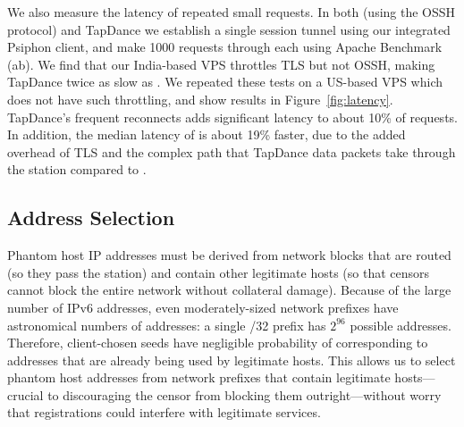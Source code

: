 \documentclass[sigconf,anonymous]{acmart}
\begin{document}
We also measure the latency of repeated small requests. In both \scheme (using
the OSSH protocol) and
TapDance we establish a single session tunnel using our integrated Psiphon
client, and make 1000 requests through each using Apache Benchmark (ab). We find
that our India-based VPS throttles TLS but not OSSH, making TapDance twice as slow as
\scheme. We repeated these tests on a US-based VPS which does not have such
throttling, and show results in Figure~\ref{fig:latency}. TapDance's frequent
reconnects adds significant latency to about 10\% of requests. In addition, the
median latency of \scheme is about 19\% faster, due to the added
overhead of TLS and the complex path that TapDance data packets take through
the station compared to \scheme.

\FigLatency


\subsection{Address Selection}
\label{sec:addr-selection}

Phantom host IP addresses must be derived from network blocks that are routed (so they pass
the \scheme station) and contain other legitimate hosts (so that censors cannot
block the entire network without collateral damage).
Because of the large number of IPv6 addresses, even
moderately-sized network prefixes have astronomical numbers of addresses: a
single /32 prefix has $2^{96}$ possible addresses. Therefore, client-chosen
seeds have negligible probability of corresponding to addresses that are already
being used by legitimate hosts. This allows us to select phantom host addresses
from network prefixes that contain
legitimate hosts---crucial to discouraging the censor from blocking them
outright---without worry that registrations could interfere with legitimate
services.

\end{document}
